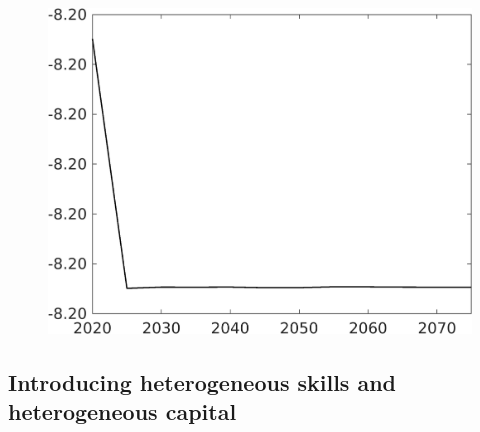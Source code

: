 \documentclass[12pt]{article}
\begin{document}
\begin{figure}[h!!]
\begin{minipage}[]{0.32\textwidth}
	\end{minipage}	
	\begin{minipage}[]{0.32\textwidth}
		\includegraphics[width=1\textwidth]{../../codding_model/own_basedOnFried/optimalPol_010922_revision/figures/all_13Sept22/CompTaul_LFBAUPer_Reg0_Ln_spillover0_nsk1_xgr1_knspil0_sep1_countec0_GovRev0_etaa0.79.png}
	\end{minipage}	
\end{figure}


\clearpage \newpage
\subsection{Introducing heterogeneous skills and heterogeneous capital}
\end{document}
